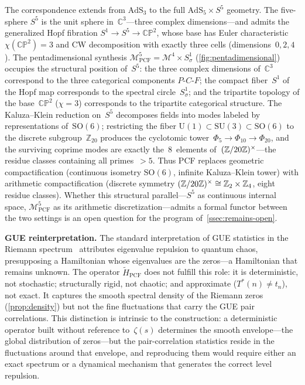 The correspondence extends from $\mathrm{AdS}_3$ to the full
$\mathrm{AdS}_5\times S^5$ geometry.
The five-sphere $S^5$ is the unit sphere in~$\mathbb{C}^3$---three
complex dimensions---and admits the generalized Hopf fibration
$S^1\to S^5\to\mathbb{CP}^2$, whose base has Euler
characteristic~$\chi(\mathbb{CP}^2)=3$ and CW decomposition with
exactly three cells (dimensions~$0,2,4$).  The pentadimensional
synthesis $\mathcal{M}^5_{\mathrm{PCF}}=\mathcal{M}^4\times S^1_\sigma$
(\cref{fig:pentadimensional}) occupies the structural
position of~$S^5$: the three complex dimensions of~$\mathbb{C}^3$
correspond to the three categorical components $P$-$C$-$F$; the
compact fiber~$S^1$ of the Hopf map corresponds to the spectral
circle~$S^1_\sigma$; and the tripartite topology of the
base~$\mathbb{CP}^2$ ($\chi=3$) corresponds to the tripartite
categorical structure.  The Kaluza--Klein reduction on~$S^5$
decomposes fields into modes labeled by representations
of~$\mathrm{SO}(6)$; restricting the fiber
$\mathrm{U}(1)\subset\mathrm{SU}(3)\subset\mathrm{SO}(6)$ to the
discrete subgroup~$\mathbb{Z}_{20}$ produces the cyclotomic
tower~$\Phi_5\to\Phi_{10}\to\Phi_{20}$, and the surviving coprime
modes are exactly the~$8$~elements of~$(\mathbb{Z}/20\mathbb{Z})^\times$---the residue
classes containing all primes~$>5$.  Thus PCF replaces geometric
compactification (continuous isometry $\mathrm{SO}(6)$, infinite
Kaluza--Klein tower) with arithmetic compactification (discrete
symmetry $(\mathbb{Z}/20\mathbb{Z})^\times\cong\mathbb{Z}_2\times\mathbb{Z}_4$, eight
residue classes).  Whether this structural parallel---$S^5$ as
continuous internal space, $\mathcal{M}^5_{\mathrm{PCF}}$ as its
arithmetic discretization---admits a formal functor between the two
settings is an open question for the program
of~\cref{ssec:remains-open}.

\smallskip\noindent\textbf{GUE reinterpretation.}
The standard interpretation of GUE statistics in the Riemann
spectrum~\cite{montgomery73,odlyzko87} attributes eigenvalue repulsion
to quantum chaos, presupposing a Hamiltonian whose eigenvalues are the
zeros---a Hamiltonian that remains unknown.  The operator
$\tilde{H}_{\mathrm{PCF}}$ does not fulfill this role: it is
deterministic, not stochastic; structurally rigid, not chaotic; and
approximate ($T^*(n)\neq t_n$), not exact.  It captures the smooth
spectral density of the Riemann zeros
(\cref{prop:density}) but not the fine fluctuations
that carry the GUE pair correlations.  This distinction is intrinsic
to the construction: a deterministic operator built without reference
to~$\zeta(s)$ determines the smooth envelope---the global
distribution of zeros---but the pair-correlation statistics reside
in the fluctuations around that envelope, and reproducing them would
require either an exact spectrum or a dynamical mechanism that
generates the correct level repulsion.

